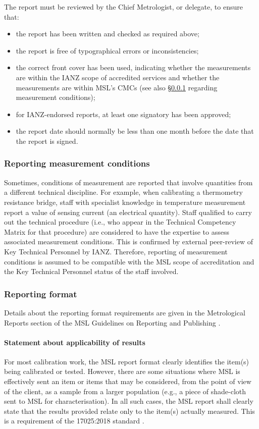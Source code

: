 The report must be reviewed by the Chief Metrologist, or delegate, to ensure that:
\begin{itemize}
\item the report has been written and checked as required above;
\item the report is free of typographical errors or inconsistencies;
\item the correct front cover has been used, indicating whether the measurements are within the IANZ scope of accredited services and whether the measurements are within MSL's CMCs (see also \S\ref{sss:measurement_conditions} regarding measurement conditions);
\item for IANZ-endorsed reports, at least one signatory has been approved;
\item the report date should normally be less than one month before the date that the report is signed.
\end{itemize} 

\subsubsection{Reporting measurement conditions}
\label{sss:measurement_conditions}
Sometimes, conditions of measurement are reported that involve quantities from a different technical discipline. For example, when calibrating a thermometry resistance bridge, staff with specialist knowledge in temperature measurement report a value of sensing current (an electrical quantity). Staff qualified to carry out the technical procedure (i.e., who appear in the Technical Competency Matrix for that procedure) are considered to have the expertise to assess associated measurement conditions. This is confirmed by external peer-review of Key Technical Personnel by IANZ. Therefore, reporting of measurement conditions is assumed to be compatible with the MSL scope of accreditation and the Key Technical Personnel status of the staff involved.

\subsubsection{Reporting format}
Details about the reporting format requirements are given in the Metrological Reports section of the MSL Guidelines on Reporting and Publishing \cite[\S\ref*{GRP-s:metrological_reports}]{MSL_Reporting_Guidelines}.

\paragraph{Statement about applicability of results}
For most calibration work, the MSL report format clearly identifies the item(s) being calibrated or tested. However, there are some situations where MSL is effectively sent an item or items that may be considered, from the point of view of the client, as a sample from a larger population (e.g., a piece of shade-cloth sent to MSL for characterisation). In all such cases, the MSL report shall clearly state that the results provided relate only to the item(s) actually measured. This is a requirement of the 17025:2018 standard \cite[clause 7.8.2.1~(l)]{ISO_17025}.      

